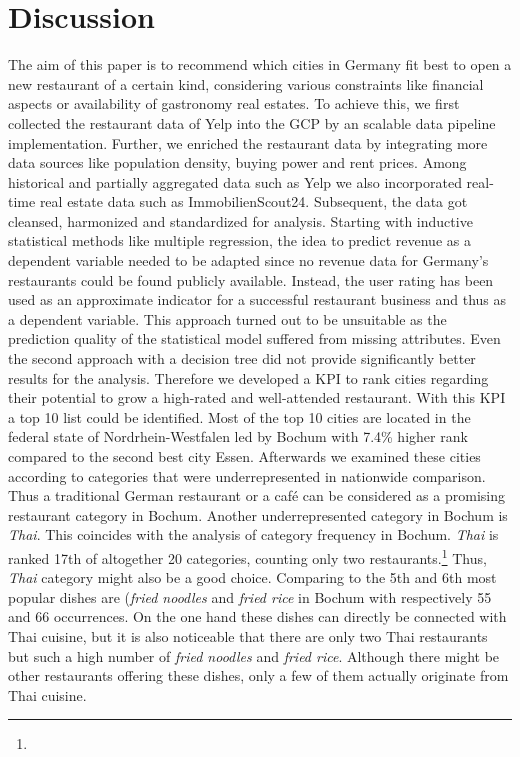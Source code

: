 \section{Discussion}
\label{sec:discussion}
The aim of this paper is to recommend which cities in Germany fit best to open a new restaurant of a certain kind, considering various constraints like financial aspects or availability of gastronomy real estates. To achieve this, we first collected the restaurant data of Yelp into the \ac{GCP} by an scalable data pipeline implementation. Further, we enriched the restaurant data by integrating more data sources like population density, buying power and rent prices.
Among historical and partially aggregated data such as Yelp we also incorporated real-time real estate data such as ImmobilienScout24. Subsequent, the data got cleansed, harmonized and standardized for analysis. \newline
Starting with inductive statistical methods like multiple regression, the idea to predict revenue as a dependent variable needed to be adapted since no revenue data for Germany's restaurants could be found publicly available. Instead, the user rating has been used as an approximate indicator for a successful restaurant business and thus as a dependent variable. This approach turned out to be unsuitable as the prediction quality of the statistical model suffered from missing attributes. Even the second approach with a decision tree did not provide significantly better results for the analysis. Therefore we developed a \ac{KPI} to rank cities regarding their potential to grow a high-rated and well-attended restaurant. With this \ac{KPI} a top 10 list could be identified. Most of the top 10 cities are located in the federal state of Nordrhein-Westfalen led by Bochum with 7.4\% higher rank compared to the second best city Essen. Afterwards we examined these cities according to categories that were underrepresented in nationwide comparison.
Thus a traditional German restaurant or a café can be considered as a promising restaurant category in Bochum. Another underrepresented category in Bochum is \textit{Thai}.
This coincides with the analysis of category frequency in Bochum. \textit{Thai} is ranked 17th of altogether 20 categories, counting only two restaurants.\footnote{} Thus, \textit{Thai} category might also be a good choice. Comparing to  the 5th and 6th most popular dishes are (\textit{fried noodles} and \textit{fried rice} in Bochum with respectively 55 and 66 occurrences. On the one hand these dishes can directly be connected with Thai cuisine, but it is also noticeable that there are only two Thai restaurants but such a high number of \textit{fried noodles} and \textit{fried rice}. Although there might be other restaurants offering these dishes, only a few of them actually originate from Thai cuisine.
